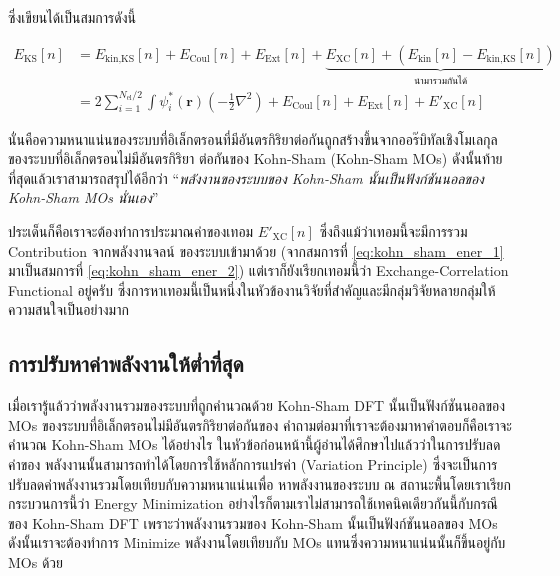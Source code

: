 \noindent ซึ่งเขียนได้เป็นสมการดังนี้

\begin{align}
    \label{eq:kohn_sham_ener_1}
    E_{\text{KS}}[n] &= E_{\text{kin,KS}}[n] + E_{\text{Coul}}[n] + E_{\text{Ext}}[n] + 
    \underbrace{E_{\text{XC}}[n] + (E_{\text{kin}}[n] - E_{\text{kin,KS}}[n])}_{\text{นำมารวมกันได้}} \\
    \label{eq:kohn_sham_ener_2}
    &= 2 \sum^{N_{\text{el}}/2}_{i=1} \int \psi^{\ast}_{i}(\bm{r}) \left ( -\frac{1}{2}\nabla^{2} \right ) 
    + E_{\text{Coul}}[n] + E_{\text{Ext}}[n] + {E'}_{\text{XC}}[n]
\end{align}

\noindent นั่นคือความหนาแน่นของระบบที่อิเล็กตรอนที่มีอันตรกิริยาต่อกันถูกสร้างขึ้นจากออร๊บิทัลเชิงโมเลกุลของระบบที่อิเล็กตรอนไม่มีอันตรกิริยา%
ต่อกันของ Kohn-Sham (Kohn-Sham MOs) ดังนั้นท้ายที่สุดแล้วเราสามารถสรุปได้อีกว่า \enquote{\textit{พลังงานของระบบของ Kohn-Sham 
นั้นเป็นฟังก์ชันนอลของ Kohn-Sham MOs นั่นเอง}}

ประเด็นก็คือเราจะต้องทำการประมาณค่าของเทอม ${E'}_{\text{XC}}[n]$ ซึ่งถึงแม้ว่าเทอมนี้จะมีการรวม Contribution จากพลังงานจลน์%
ของระบบเข้ามาด้วย (จากสมการที่ \ref{eq:kohn_sham_ener_1} มาเป็นสมการที่ \ref{eq:kohn_sham_ener_2}) แต่เราก็ยังเรียกเทอมนี้ว่า 
Exchange-Correlation Functional อยู่ครับ ซึ่งการหาเทอมนี้เป็นหนึ่งในหัวข้องานวิจัยที่สำคัญและมีกลุ่มวิจัยหลายกลุ่มให้ความสนใจเป็นอย่างมาก

\subsection{การปรับหาค่าพลังงานให้ต่ำที่สุด}
\label{ssec:kohn_sham_ener_minimize}

เมื่อเรารู้แล้วว่าพลังงานรวมของระบบที่ถูกคำนวณด้วย Kohn-Sham DFT นั้นเป็นฟังก์ชันนอลของ MOs ของระบบที่อิเล็กตรอนไม่มีอันตรกิริยาต่อกันของ 
คำถามต่อมาที่เราจะต้องมาหาคำตอบก็คือเราจะคำนวณ Kohn-Sham MOs ได้อย่างไร ในหัวข้อก่อนหน้านี้ผู้อ่านได้ศึกษาไปแล้วว่าในการปรับลดค่าของ%
พลังงานนั้นสามารถทำได้โดยการใช้หลักการแปรค่า (Variation Principle) ซึ่งจะเป็นการปรับลดค่าพลังงานรวมโดยเทียบกับความหนาแน่นเพื่อ%
หาพลังงานของระบบ ณ สถานะพื้นโดยเราเรียกกระบวนการนี้ว่า Energy Minimization อย่างไรก็ตามเราไม่สามารถใช้เทคนิคเดียวกันนี้กับกรณีของ%
Kohn-Sham DFT เพราะว่าพลังงานรวมของ Kohn-Sham นั้นเป็นฟังก์ชันนอลของ MOs ดังนั้นเราจะต้องทำการ Minimize พลังงานโดยเทียบกับ MOs 
แทนซึ่งความหนาแน่นนั้นก็ขึ้นอยู่กับ MOs ด้วย 

